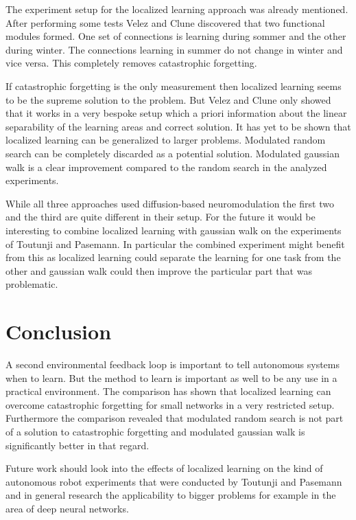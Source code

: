 \documentclass[12pt,twoside]{scrartcl}
\theoremstyle{plain}
\theoremstyle{definition}
\theoremstyle{remark}
\begin{document}
The experiment setup for the localized learning approach was already mentioned.
After performing some tests Velez and Clune discovered that two functional
modules formed. One set of connections is learning during sommer and the other
during winter. The connections learning in summer do not change in winter and
vice versa. This completely removes catastrophic forgetting.

If catastrophic forgetting is the only measurement then localized learning
seems to be the supreme solution to the problem. But Velez and Clune only
showed that it works in a very bespoke setup which a priori information about
the linear separability of the learning areas and correct solution. It has yet
to be shown that localized learning can be generalized to larger problems.
Modulated random search can be completely discarded as a potential solution.
Modulated gaussian walk is a clear improvement compared to the random search
in the analyzed experiments.

While all three approaches used diffusion-based neuromodulation the first two and
the third are quite different in their setup. For the future it would be interesting
to combine localized learning with gaussian walk on the experiments of Toutunji
and Pasemann. In particular the combined experiment might benefit from this as
localized learning could separate the learning for one task from the other
and gaussian walk could then improve the particular part that was problematic.

\section{Conclusion}
\label{sec:concl}

A second environmental feedback loop is important to tell autonomous systems
when to learn. But the method to learn is important as well to be any use
in a practical environment. The comparison has shown that localized learning
can overcome catastrophic forgetting for small networks in a very restricted
setup. Furthermore the comparison revealed that modulated random search is
not part of a solution to catastrophic forgetting and modulated gaussian
walk is significantly better in that regard.

Future work should look into the effects of localized learning on the kind of
autonomous robot experiments that were conducted by Toutunji and Pasemann and
in general research the applicability to bigger problems for example in the area
of deep neural networks.

%
%
\newpage
\printbibliography
{}%
\end{document}
